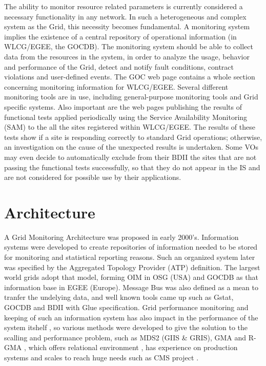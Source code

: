 The ability to monitor resource related parameters is currently considered a
necessary functionality in any network. In such a heterogeneous and complex
system as the Grid, this necessity becomes fundamental. A monitoring system
implies the existence of a central repository of operational information (in
WLCG/EGEE, the GOCDB). The monitoring system should be able to collect data from
the resources in the system, in order to analyze the usage, behavior and
performance of the Grid, detect and notify fault conditions, contract violations
and user-defined events.
The GOC web page contains a whole section
concerning monitoring information for WLCG/EGEE. Several different monitoring
tools are in use, including general-purpose monitoring tools and Grid specific
systems.
Also important are the web pages publishing the results of functional tests
applied periodically using the Service Availability Monitoring (SAM) to the all
the sites registered within WLCG/EGEE. The results of these tests show if a site
is responding correctly to standard Grid operations; otherwise, an investigation
on the cause of the unexpected results is undertaken. Some VOs may even decide
to automatically exclude from their BDII the sites that are not passing the
functional tests successfully, so that they do not appear in the IS and are not
considered for possible use by their applications.



\section{Architecture}
A Grid Monitoring Architecture \cite{tierney2002grid} was proposed in early
2000's. Information systems were developed to create repositories of information
needed to be stored for monitoring and statistical reporting reasons. Such an
organized system later was specified by the Aggregated Topology Provider (ATP)
definition. The largest world grids adopt that model, forming OIM in OSG (USA)
and GOCDB as that information base in EGEE (Europe). Message Bus was also
defined as a mean to tranfer the undelying data, and well known tools came up
such as Gstat, GOCDB and BDII with Glue specification. Grid performance
monitoring and keeping of such an information system has also impact in the
performance of the system itshelf \cite{zhang2003performance}, so various
methods were developed to give the solution to the scalling and performance
problem, such as MDS2 (GIIS \& GRIS), GMA and R-GMA
\cite{wilson2004information}, which offers relational environment
\cite{fisher2001relational}, has experience on production systems 
\cite{byrom-production} and scales to reach huge needs such as CMS project
\cite{Bonacorsi2004,Byrom}.


